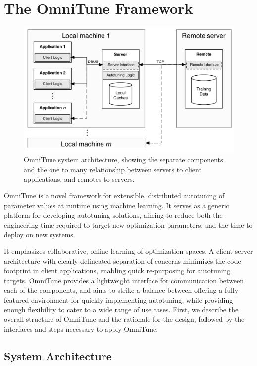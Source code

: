 \documentclass[nonatbib,preprint,nocopyrightspace,9pt]{sigplanconf}
\begin{document}
\section{The OmniTune Framework}\label{sec:autotune}

\begin{figure}
\centering
\includegraphics[width=.98\columnwidth]{img/omnitune-system-overview.pdf}
\caption{%
  OmniTune system architecture, showing the separate components and
  the one to many relationship between servers to client applications,
  and remotes to servers.%
}
\label{fig:omnitune-system-overview}
\end{figure}

OmniTune is a novel framework for extensible, distributed autotuning
of parameter values at runtime using machine learning. It serves as a
generic platform for developing autotuning solutions, aiming to reduce
both the engineering time required to target new optimization
parameters, and the time to deploy on new systems.

It emphasizes collaborative, online learning of optimization spaces. A
client-server architecture with clearly delineated separation of
concerns minimizes the code footprint in client applications, enabling
quick re-purposing for autotuning targets. OmniTune provides a
lightweight interface for communication between each of the
components, and aims to strike a balance between offering a fully
featured environment for quickly implementing autotuning, while
providing enough flexibility to cater to a wide range of use
cases. First, we describe the overall structure of OmniTune and the
rationale for the design, followed by the interfaces and steps
necessary to apply OmniTune.


\subsection{System Architecture}
\end{document}
